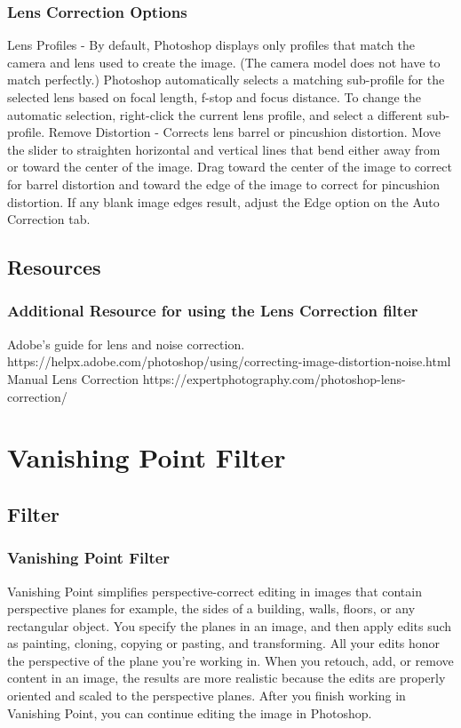 \documentclass{beamer}
\begin{document}
	\begin{frame}
	\frametitle{Lens Correction Options}
	\begin{outline}
		\1 Lens Profiles - 
		\2 By default, Photoshop displays only profiles that match the camera and lens used to create the image. (The camera model does not have to match perfectly.) 
		\2 Photoshop automatically selects a matching sub-profile for the selected lens based on focal length, f-stop and focus distance. 
		\2 To change the automatic selection, right-click the current lens profile, and select a different sub-profile.
		\1 Remove Distortion - 
		\2 Corrects lens barrel or pincushion distortion. 
		\2 Move the slider to straighten horizontal and vertical lines that bend either away from or toward the center of the image. 
		\2 Drag toward the center of the image to correct for barrel distortion and toward the edge of the image to correct for pincushion distortion. 
		\2 If any blank image edges result, adjust the Edge option on the Auto Correction tab.
	\end{outline}
\end{frame}

					\subsection{Resources}		
	\begin{frame}
		\frametitle{Additional Resource for using the Lens Correction filter}
		\begin{outline}
			\1 Adobe's guide for lens and noise correction.
			\2 https://helpx.adobe.com/photoshop/using/correcting-image-distortion-noise.html
			\1 Manual Lens Correction
			\2 https://expertphotography.com/photoshop-lens-correction/
		\end{outline}
	\end{frame}
	
	
		\section{Vanishing Point Filter}
			\subsection{Filter}		
				\begin{frame}
					\frametitle{Vanishing Point Filter}
					\begin{outline}
						\1 Vanishing Point simplifies perspective-correct editing in images that contain perspective planes
						\2 for example, the sides of a building, walls, floors, or any rectangular object.
						\1 You specify the planes in an image, and then apply edits such as painting, cloning, copying or pasting, and transforming. 
						\1 All your edits honor the perspective of the plane you’re working in. 
						\1 When you retouch, add, or remove content in an image, the results are more realistic because the edits are properly oriented and scaled to the perspective planes. 
						\1 After you finish working in Vanishing Point, you can continue editing the image in Photoshop.
					\end{outline}
				\end{frame}
			
\end{document}
